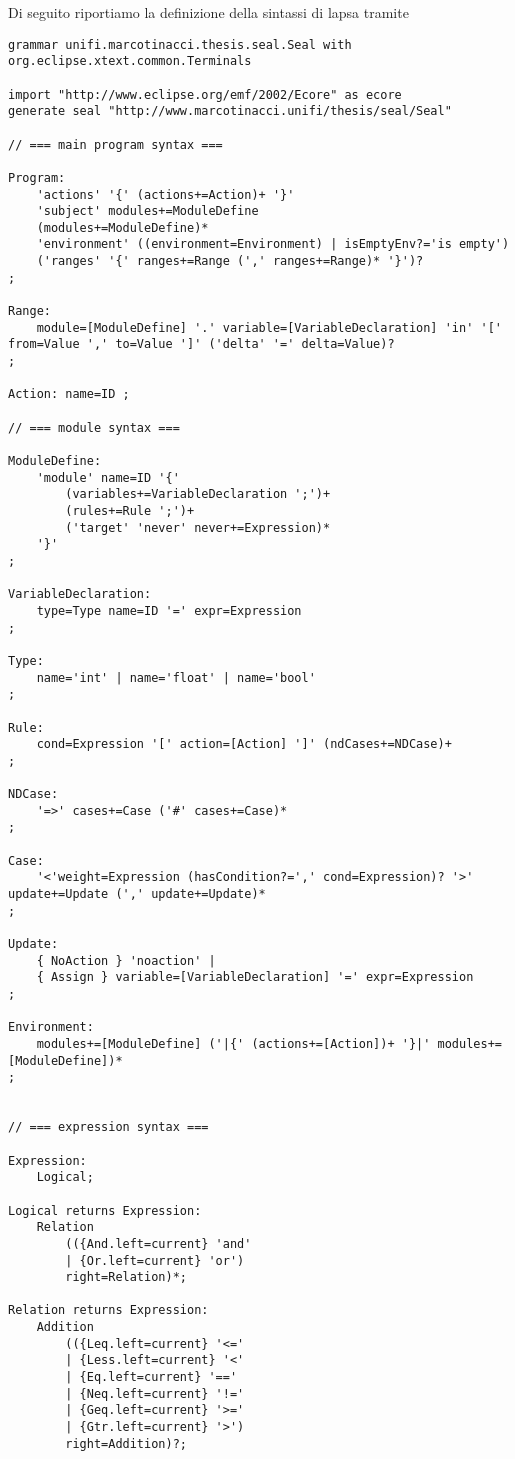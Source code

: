 \label{app:sintassi:lapsa}
Di seguito riportiamo la definizione della sintassi di \ac{lapsa} tramite \xtext{}

\begin{lstlisting}[language=xtext,style=eclipse,caption={Sintassi di \acs{lapsa} in \xtext{}},label=code:lapsa:syntax]
grammar unifi.marcotinacci.thesis.seal.Seal with org.eclipse.xtext.common.Terminals

import "http://www.eclipse.org/emf/2002/Ecore" as ecore
generate seal "http://www.marcotinacci.unifi/thesis/seal/Seal"

// === main program syntax ===

Program:
	'actions' '{' (actions+=Action)+ '}'
	'subject' modules+=ModuleDefine
	(modules+=ModuleDefine)*
	'environment' ((environment=Environment) | isEmptyEnv?='is empty')
	('ranges' '{' ranges+=Range (',' ranges+=Range)* '}')?
;

Range:
	module=[ModuleDefine] '.' variable=[VariableDeclaration] 'in' '[' from=Value ',' to=Value ']' ('delta' '=' delta=Value)?
;

Action: name=ID ;

// === module syntax ===

ModuleDefine: 
	'module' name=ID '{'
		(variables+=VariableDeclaration ';')+
		(rules+=Rule ';')+
		('target' 'never' never+=Expression)*
	'}'
;

VariableDeclaration:
	type=Type name=ID '=' expr=Expression
;

Type:
	name='int' | name='float' | name='bool'
;

Rule:
	cond=Expression '[' action=[Action] ']' (ndCases+=NDCase)+
;

NDCase:
	'=>' cases+=Case ('#' cases+=Case)*
;

Case:
	'<'weight=Expression (hasCondition?=',' cond=Expression)? '>' update+=Update (',' update+=Update)*
;

Update:
	{ NoAction } 'noaction' | 
	{ Assign } variable=[VariableDeclaration] '=' expr=Expression
;

Environment:
	modules+=[ModuleDefine] ('|{' (actions+=[Action])+ '}|' modules+=[ModuleDefine])*
;


// === expression syntax ===

Expression:
	Logical;

Logical returns Expression:
	Relation
		(({And.left=current} 'and' 
		| {Or.left=current} 'or') 
		right=Relation)*;

Relation returns Expression:
	Addition 
		(({Leq.left=current} '<='
		| {Less.left=current} '<'
		| {Eq.left=current} '=='
		| {Neq.left=current} '!='
		| {Geq.left=current} '>='
		| {Gtr.left=current} '>')
		right=Addition)?;


\end{lstlisting}
